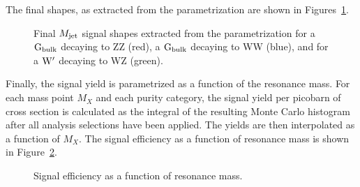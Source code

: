 The final \MJO shapes, as extracted from the parametrization are shown in Figures~\ref{fig:MJfromjson}.
\begin{figure}[h!]
\centering
{}
\caption{Final $M_{\rm jet}$ signal shapes extracted from the parametrization for a $\mathrm{G}_\mathrm{bulk}$ decaying to ZZ (red), a $\mathrm{G}_\mathrm{bulk}$ decaying to WW (blue), and for a $\mathrm{W}^\prime$ decaying to WZ (green).}
\label{fig:MJfromjson}
\end{figure}
Finally, the signal yield is parametrized as a function of the resonance mass. For each mass point $M_X$ and each purity category, the signal yield per picobarn of cross section is calculated as the integral of the resulting Monte Carlo histogram after all analysis selections have been applied.
The yields are then interpolated as a function of $M_X$. The signal efficiency as a function of resonance mass is shown in Figure~\ref{fig:SignalYields}.
\begin{figure}[h!]
\centering
{}
\caption{Signal efficiency as a function of resonance mass.}
\label{fig:SignalYields}
\end{figure}
\clearpage


